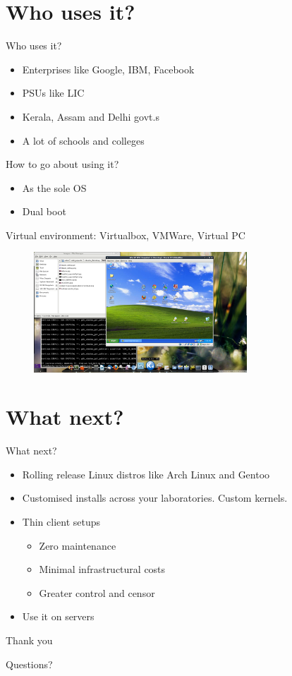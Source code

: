 \documentclass{beamer}
\begin{document}
 \section{Who uses it?}
 \begin{frame}{Who uses it?}
  \begin{itemize}
   \pause
   \item Enterprises like Google, IBM, Facebook
   \pause
   \item PSUs like LIC
   \pause
   \item Kerala, Assam and Delhi govt.s
   \pause
   \item A lot of schools and colleges
  \end{itemize}
 \end{frame}

 \begin{frame}{How to go about using it?}
  \begin{itemize}
   \pause
   \item As the sole OS
   \pause
   \item Dual boot
  \end{itemize}
 \end{frame}

 \begin{frame}
  Virtual environment: Virtualbox, VMWare, Virtual PC
   \begin{figure}
    \includegraphics[width=8cm]{Images/virtualbox_screenshot}
   \end{figure}
 \end{frame}

 \section{What next?}
 \begin{frame}{What next?}
  \begin{itemize}
   \pause
   \item Rolling release Linux distros like Arch Linux and Gentoo
   \pause
   \item Customised installs across your laboratories. Custom kernels.
   \pause
   \item Thin client setups
    \begin{itemize}
     \item Zero maintenance
     \item Minimal infrastructural costs
     \item Greater control and censor
    \end{itemize}
   \pause
   \item Use it on servers
  \end{itemize}
 \end{frame}

 \begin{frame}{Thank you}
  \begin{center}
   \LARGE{Questions?}
  \end{center}
 \end{frame}
\end{document}
